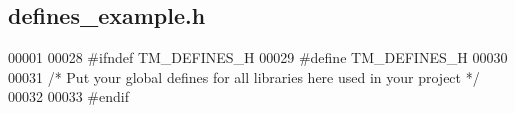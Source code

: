 \hypertarget{defines__example_8h_source}{}\subsection{defines\+\_\+example.\+h}

\begin{DoxyCode}
00001 
00028 \textcolor{preprocessor}{#ifndef TM\_DEFINES\_H}
00029 \textcolor{preprocessor}{#define TM\_DEFINES\_H}
00030 
00031 \textcolor{comment}{/* Put your global defines for all libraries here used in your project */}
00032 
00033 \textcolor{preprocessor}{#endif}
\end{DoxyCode}
